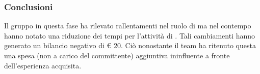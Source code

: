 		\subsubsection{Conclusioni}
			Il gruppo \groupname{} in questa fase ha rilevato rallentamenti nel ruolo di  ma nel contempo hanno notato una riduzione dei tempi per l'attività di . Tali cambiamenti hanno generato un bilancio negativo di \euro{} 20. Ciò nonostante il team ha ritenuto questa una spesa (non a carico del committente) aggiuntiva ininfluente a fronte dell'esperienza acquisita. 
	
	
